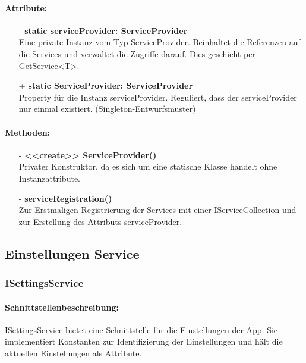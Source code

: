 \documentclass[a4paper,12pt]{article}
\begin{document}
	\paragraph{Attribute:}
	\begin{itemize}
		\item[-] \textbf{static serviceProvider: ServiceProvider}\\Eine private Instanz vom Typ ServiceProvider. Beinhaltet die Referenzen auf die Services und verwaltet die Zugriffe darauf. Dies geschieht per GetService<T>.
		\item[+] \textbf{static ServiceProvider: ServiceProvider}\\Property für die Instanz serviceProvider. Reguliert, dass der serviceProvider nur einmal existiert. (Singleton-Entwurfsmuster)

	\end{itemize}
	\paragraph{Methoden:}
	\begin{itemize}
		\item[-] \textbf{<<create>> ServiceProvider()}\\Privater Konstruktor, da es sich um eine statische Klasse handelt ohne Instanzattribute.
		\item[-] \textbf{serviceRegistration()}\\ Zur Erstmaligen Registrierung der Services mit einer IServiceCollection und zur Erstellung des Attributs serviceProvider.\\
	\end{itemize}
		
		
		
		
		
\subsection{Einstellungen Service}
\subsubsection{ISettingsService}
	\paragraph{Schnittstellenbeschreibung:}
	ISettingsService bietet eine Schnittstelle für die Einstellungen der App. Sie implementiert Konstanten zur Identifizierung der Einstellungen und hält die aktuellen Einstellungen als Attribute.
\end{document}
